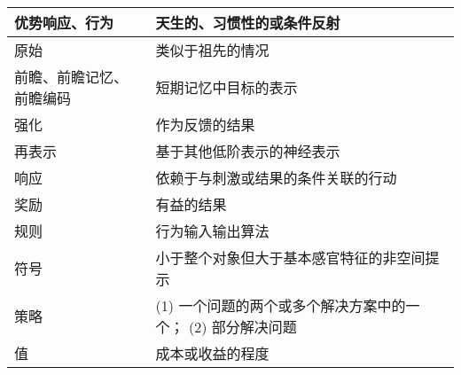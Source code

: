 \begin{table}[htbp]
{\begin{tabular}{ll}
			\midrule
			优势响应、行为      &天生的、习惯性的或条件反射   \\
			\midrule
			原始     &类似于祖先的情况   \\
			\midrule
			前瞻、前瞻记忆、前瞻编码       &短期记忆中目标的表示   \\
			\midrule
			强化       &作为反馈的结果   \\
			\midrule
			再表示       &基于其他低阶表示的神经表示   \\
			\midrule
			响应       &依赖于与刺激或结果的条件关联的行动   \\
			\midrule
			奖励       &有益的结果   \\
			\midrule
			规则      &行为输入输出算法   \\
			\midrule
			符号      &小于整个对象但大于基本感官特征的非空间提示   \\
			\midrule
			策略      &(1) 一个问题的两个或多个解决方案中的一个； (2) 部分解决问题   \\
			\midrule
			值      &成本或收益的程度   \\
			\bottomrule  
			
	\end{tabular}}
\end{table}%

